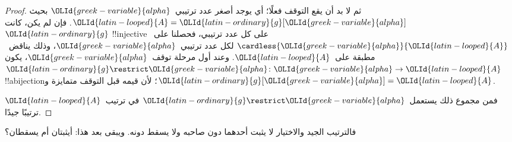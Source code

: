 \documentclass[../../../include/open-logic-section]{subfiles}
\begin{document}
\begin{proof}
ثم لا بد أن يقع التوقف فعلًا؛ أي يوجد أصغر عدد ترتيبي~$\OLId{greek-variable}{alpha}$ بحيث
$\OLId{latin-looped}{A} = \OLId{latin-ordinary}{g}[\OLId{greek-variable}{alpha}]$. فإن لم يكن، كانت~$\OLId{latin-ordinary}{g}$ !!{injective} على كل عدد
ترتيبي، فحصلنا على~$\cardless{\OLId{greek-variable}{alpha}}{\OLId{latin-looped}{A}}$ لكل عدد ترتيبي~$\OLId{greek-variable}{alpha}$،
وذلك يناقض~ مطبقة على~$\OLId{latin-looped}{A}$. وعند أول
مرحلة توقف~$\OLId{greek-variable}{alpha}$، يكون
$\OLId{latin-ordinary}{g}\restrict\OLId{greek-variable}{alpha} \colon \OLId{greek-variable}{alpha} \to \OLId{latin-looped}{A}$ !!a{bijection}؛ لأن قيمه قبل
التوقف متمايزة و$\OLId{latin-ordinary}{g}[\OLId{greek-variable}{alpha}] = \OLId{latin-looped}{A}$.

فمن مجموع ذلك يستعمل~$\OLId{latin-ordinary}{g}\restrict\OLId{greek-variable}{alpha}$ في ترتيب~$\OLId{latin-looped}{A}$ ترتيبًا جيدًا.
\end{proof}

فالترتيب الجيد والاختيار لا يثبت أحدهما دون صاحبه ولا يسقط دونه. ويبقى
بعد هذا: أيثبتان أم يسقطان؟
\end{document}
